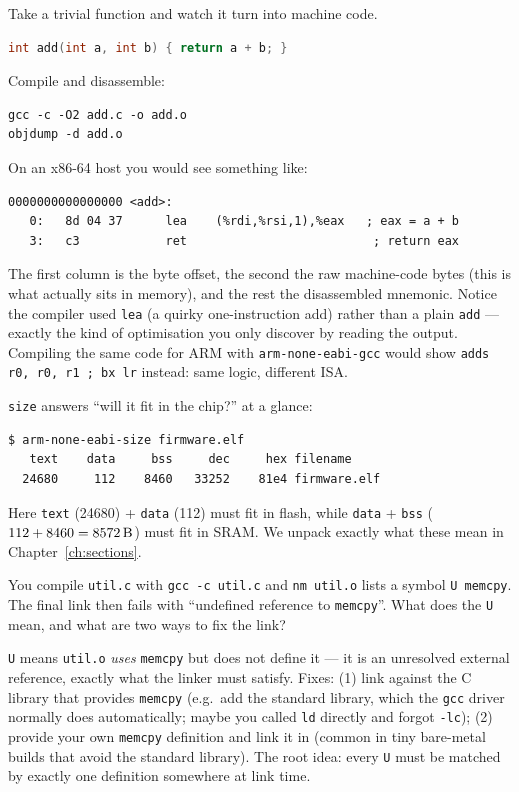 \documentclass[11pt,a4paper,oneside]{book}
\newcommand{\code}[1]{\texttt{#1}}
\begin{document}
\begin{wexample}
Take a trivial function and watch it turn into machine code.
\begin{lstlisting}[language=C]
int add(int a, int b) { return a + b; }
\end{lstlisting}
Compile and disassemble:
\begin{lstlisting}[style=shell]
gcc -c -O2 add.c -o add.o
objdump -d add.o
\end{lstlisting}
On an x86-64 host you would see something like:
\begin{lstlisting}[style=asm]
0000000000000000 <add>:
   0:   8d 04 37      lea    (%rdi,%rsi,1),%eax   ; eax = a + b
   3:   c3            ret                          ; return eax
\end{lstlisting}
The first column is the byte offset, the second the raw machine-code bytes (this
is what actually sits in memory), and the rest the disassembled mnemonic. Notice
the compiler used \code{lea} (a quirky one-instruction add) rather than a plain
\code{add} --- exactly the kind of optimisation you only discover by reading the
output. Compiling the same code for ARM with \code{arm-none-eabi-gcc} would show
\code{adds r0, r0, r1 ; bx lr} instead: same logic, different ISA.
\end{wexample}

\begin{wexample}
\code{size} answers ``will it fit in the chip?'' at a glance:
\begin{lstlisting}[style=shell]
$ arm-none-eabi-size firmware.elf
   text    data     bss     dec     hex filename
  24680     112    8460   33252    81e4 firmware.elf
\end{lstlisting}
Here \code{text} (\qty{24680}{\byte}) + \code{data} (\qty{112}{\byte}) must fit
in flash, while \code{data} + \code{bss} ($112+8460=\qty{8572}{\byte}$) must fit
in SRAM.
We unpack exactly what these mean in Chapter~\ref{ch:sections}.
\end{wexample}

\begin{exercise}
You compile \code{util.c} with \code{gcc -c util.c} and \code{nm util.o} lists a
symbol \code{U memcpy}. The final link then fails with ``undefined reference to
\code{memcpy}''. What does the \code{U} mean, and what are two ways to fix the
link?
\end{exercise}
\begin{solution}
\code{U} means \code{util.o} \emph{uses} \code{memcpy} but does not define it ---
it is an unresolved external reference, exactly what the linker must satisfy.
Fixes: (1) link against the C library that provides \code{memcpy} (e.g.\ add the
standard library, which the \code{gcc} driver normally does automatically;
maybe you called \code{ld} directly and forgot \code{-lc}); (2) provide your own
\code{memcpy} definition and link it in (common in tiny bare-metal builds that
avoid the standard library). The root idea: every \code{U} must be matched by
exactly one definition somewhere at link time.
\end{solution}
\end{document}
